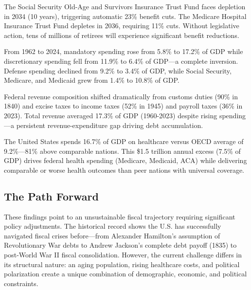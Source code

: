 \documentclass[12pt,letterpaper]{article}
\begin{document}
\begin{tcolorbox}[colback=lightblue,colframe=darkblue,title=\textbf{Finding \#4: Entitlement Insolvency Within a Decade}]
The Social Security Old-Age and Survivors Insurance Trust Fund faces depletion in 2034 (10 years), triggering automatic 23\% benefit cuts. The Medicare Hospital Insurance Trust Fund depletes in 2036, requiring 11\% cuts. Without legislative action, tens of millions of retirees will experience significant benefit reductions.
\end{tcolorbox}

\begin{tcolorbox}[colback=lightblue,colframe=darkblue,title=\textbf{Finding \#5: Complete Reversal of Spending Composition}]
From 1962 to 2024, mandatory spending rose from 5.8\% to 17.2\% of GDP while discretionary spending fell from 11.9\% to 6.4\% of GDP—a complete inversion. Defense spending declined from 9.2\% to 3.4\% of GDP, while Social Security, Medicare, and Medicaid grew from 1.4\% to 10.8\% of GDP.
\end{tcolorbox}

\begin{tcolorbox}[colback=lightblue,colframe=darkblue,title=\textbf{Finding \#6: Revenue Transformation and Stagnation}]
Federal revenue composition shifted dramatically from customs duties (90\% in 1840) and excise taxes to income taxes (52\% in 1945) and payroll taxes (36\% in 2023). Total revenue averaged 17.3\% of GDP (1960-2023) despite rising spending—a persistent revenue-expenditure gap driving debt accumulation.
\end{tcolorbox}

\begin{tcolorbox}[colback=lightblue,colframe=darkblue,title=\textbf{Finding \#7: U.S. Healthcare Exceptionally Expensive}]
The United States spends 16.7\% of GDP on healthcare versus OECD average of 9.2\%—81\% above comparable nations. This \$1.5 trillion annual excess (7.5\% of GDP) drives federal health spending (Medicare, Medicaid, ACA) while delivering comparable or worse health outcomes than peer nations with universal coverage.
\end{tcolorbox}

\subsection{The Path Forward}

These findings point to an unsustainable fiscal trajectory requiring significant policy adjustments. The historical record shows the U.S. has successfully navigated fiscal crises before—from Alexander Hamilton's assumption of Revolutionary War debts to Andrew Jackson's complete debt payoff (1835) to post-World War II fiscal consolidation. However, the current challenge differs in its structural nature: an aging population, rising healthcare costs, and political polarization create a unique combination of demographic, economic, and political constraints.
\end{document}
